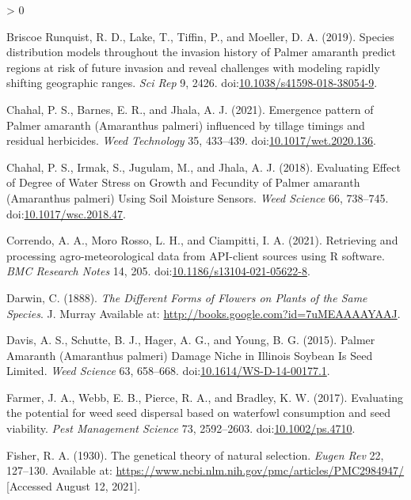 \documentclass[utf8]{frontiersSCNS}
\newlength{\cslhangindent}
\newenvironment{CSLReferences}[2] %
 {%
  \setlength{\parindent}{0pt}
  \ifodd #1 \everypar{\setlength{\hangindent}{\cslhangindent}}\ignorespaces\fi
  \ifnum #2 > 0
  \setlength{\parskip}{#2\baselineskip}
  \fi
 }%
 {}
\begin{document}
\begin{CSLReferences}{1}{0}
\leavevmode\hypertarget{ref-briscoerunquist2019}{}%
Briscoe Runquist, R. D., Lake, T., Tiffin, P., and Moeller, D. A.
(2019). Species distribution models throughout the invasion history of
{Palmer} amaranth predict regions at risk of future invasion and reveal
challenges with modeling rapidly shifting geographic ranges. \emph{Sci
Rep} 9, 2426.
doi:\href{https://doi.org/10.1038/s41598-018-38054-9}{10.1038/s41598-018-38054-9}.

\leavevmode\hypertarget{ref-chahal2021}{}%
Chahal, P. S., Barnes, E. R., and Jhala, A. J. (2021). Emergence pattern
of {Palmer} amaranth ({Amaranthus} palmeri) influenced by tillage
timings and residual herbicides. \emph{Weed Technology} 35, 433--439.
doi:\href{https://doi.org/10.1017/wet.2020.136}{10.1017/wet.2020.136}.

\leavevmode\hypertarget{ref-chahal2018}{}%
Chahal, P. S., Irmak, S., Jugulam, M., and Jhala, A. J. (2018).
Evaluating {Effect} of {Degree} of {Water Stress} on {Growth} and
{Fecundity} of {Palmer} amaranth ({Amaranthus} palmeri) {Using Soil
Moisture Sensors}. \emph{Weed Science} 66, 738--745.
doi:\href{https://doi.org/10.1017/wsc.2018.47}{10.1017/wsc.2018.47}.

\leavevmode\hypertarget{ref-correndo2021}{}%
Correndo, A. A., Moro Rosso, L. H., and Ciampitti, I. A. (2021).
Retrieving and processing agro-meteorological data from {API}-client
sources using {R} software. \emph{BMC Research Notes} 14, 205.
doi:\href{https://doi.org/10.1186/s13104-021-05622-8}{10.1186/s13104-021-05622-8}.

\leavevmode\hypertarget{ref-darwin1888}{}%
Darwin, C. (1888). \emph{The {Different Forms} of {Flowers} on {Plants}
of the {Same Species}}. {J. Murray} Available at:
\url{http://books.google.com?id=7uMEAAAAYAAJ}.

\leavevmode\hypertarget{ref-davis2015}{}%
Davis, A. S., Schutte, B. J., Hager, A. G., and Young, B. G. (2015).
Palmer {Amaranth} ({Amaranthus} palmeri) {Damage Niche} in {Illinois
Soybean Is Seed Limited}. \emph{Weed Science} 63, 658--668.
doi:\href{https://doi.org/10.1614/WS-D-14-00177.1}{10.1614/WS-D-14-00177.1}.

\leavevmode\hypertarget{ref-farmer2017}{}%
Farmer, J. A., Webb, E. B., Pierce, R. A., and Bradley, K. W. (2017).
Evaluating the potential for weed seed dispersal based on waterfowl
consumption and seed viability. \emph{Pest Management Science} 73,
2592--2603. doi:\href{https://doi.org/10.1002/ps.4710}{10.1002/ps.4710}.

\leavevmode\hypertarget{ref-fisher1930}{}%
Fisher, R. A. (1930). The genetical theory of natural selection.
\emph{Eugen Rev} 22, 127--130. Available at:
\url{https://www.ncbi.nlm.nih.gov/pmc/articles/PMC2984947/} {[}Accessed
August 12, 2021{]}.


\end{CSLReferences}
\end{document}
